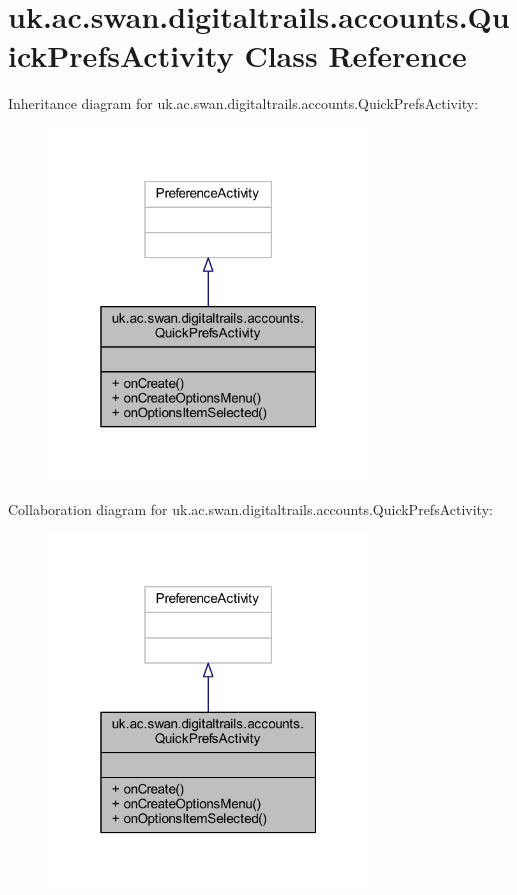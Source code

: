 \hypertarget{classuk_1_1ac_1_1swan_1_1digitaltrails_1_1accounts_1_1_quick_prefs_activity}{\section{uk.\+ac.\+swan.\+digitaltrails.\+accounts.\+Quick\+Prefs\+Activity Class Reference}
\label{classuk_1_1ac_1_1swan_1_1digitaltrails_1_1accounts_1_1_quick_prefs_activity}
}


Inheritance diagram for uk.\+ac.\+swan.\+digitaltrails.\+accounts.\+Quick\+Prefs\+Activity\+:
\nopagebreak
\begin{figure}[H]
\begin{center}
\leavevmode
\includegraphics[width=241pt]{classuk_1_1ac_1_1swan_1_1digitaltrails_1_1accounts_1_1_quick_prefs_activity__inherit__graph}
\end{center}
\end{figure}


Collaboration diagram for uk.\+ac.\+swan.\+digitaltrails.\+accounts.\+Quick\+Prefs\+Activity\+:
\nopagebreak
\begin{figure}[H]
\begin{center}
\leavevmode
\includegraphics[width=241pt]{classuk_1_1ac_1_1swan_1_1digitaltrails_1_1accounts_1_1_quick_prefs_activity__coll__graph}
\end{center}
\end{figure}
